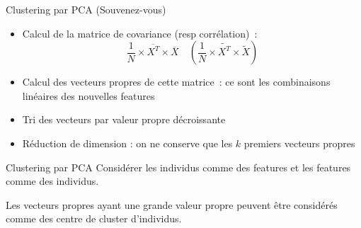 \begin{frame}{Clustering par PCA}
  (Souvenez-vous)

  \begin{itemize}[<+->]
    \item Calcul de la matrice de covariance (resp corrélation)~:
      \[
      \frac{1}{N} \times \overline{X^T} \times \overline{X}
      \quad
      ( \frac{1}{N} \times \widetilde{X^T} \times \widetilde{X} )
      \]
    \item Calcul des vecteurs propres de cette matrice~: ce sont les combinaisons linéaires des nouvelles features
    \item Tri des vecteurs par valeur propre décroissante
    \item Réduction de dimension : on ne conserve que les $k$ premiers vecteurs propres
  \end{itemize}
\end{frame}

\begin{frame}{Clustering par PCA}
  Considérer les individus comme des features et les features comme des individus.
  
  Les vecteurs propres ayant une grande valeur propre peuvent être considérés comme des centre de cluster d'individus.
\end{frame}
